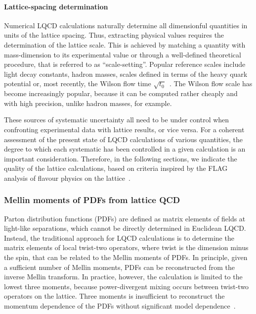 \paragraph{Lattice-spacing determination} Numerical LQCD calculations 
naturally determine all dimensionful quantities in units of the
lattice spacing. Thus, extracting physical values requires the
determination of the lattice scale. This is achieved by matching a
quantity with mass-dimension to its experimental value or through a
well-defined theoretical procedure, that is referred to as
``scale-setting''. Popular reference scales include light decay
constants, hadron masses, scales defined in terms of the heavy quark
potential or, most recently, the Wilson flow time
$\sqrt{t_0}$~\cite{Luscher:2010iy}. The Wilson flow scale has become
increasingly popular, because it can be computed rather cheaply and
with high precision, unlike hadron masses, for example.

These sources of systematic uncertainty all need to be under control
when confronting experimental data with lattice results, or vice
versa. For a coherent assessment of the present state of LQCD
calculations of various quantities, the degree to which each
systematic has been controlled in a given calculation is an important
consideration. Therefore, in the following sections, we indicate the
quality of the lattice calculations, based on criteria inspired by the
FLAG analysis of flavour physics on the lattice~\cite{Aoki:2016frl}.


\subsubsection{Mellin moments of PDFs from lattice QCD}
\label{Sec:MomentsLQCD}

Parton distribution functions (PDFs) are defined as matrix elements of fields at light-like separations, which cannot be directly determined in Euclidean LQCD. Instead, the traditional approach for LQCD calculations is to determine the matrix elements of local twist-two operators, where twist is the dimension minus the spin, that can be related to the Mellin moments of PDFs. In principle, given a sufficient number of Mellin moments, PDFs can be reconstructed from the inverse Mellin transform. In practice, however, the calculation is limited to the lowest three moments, because power-divergent mixing occurs between twist-two operators on the lattice. Three moments is insufficient to reconstruct the momentum dependence of the PDFs without significant model dependence~\cite{Detmold:2003rq}.

